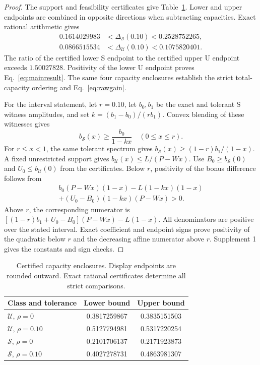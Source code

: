 \documentclass{optica-article}
\begin{document}
\begin{proof}
The support and feasibility certificates give Table~\ref{tab:capacity}. Lower and upper endpoints are combined in opposite directions when subtracting capacities. Exact rational arithmetic gives
\begin{align}
 0.1614029983&<\Delta_{\mathcal S}(0.10)<0.2528752265,\\
 0.0866515534&<\Delta_{\mathcal U}(0.10)<0.1075820401.
 \label{eq:bonusbounds}
\end{align}
The ratio of the certified lower S endpoint to the certified upper U endpoint exceeds $1.50027828$. Positivity of the lower U endpoint proves Eq.~\eqref{eq:mainresult}. The same four capacity enclosures establish the strict total-capacity ordering and Eq.~\eqref{eq:rawgain}.

For the interval statement, let $r=0.10$, let $b_0,b_1$ be the exact and tolerant S witness amplitudes, and set $k=(b_1-b_0)/(rb_1)$. Convex blending of these witnesses gives
\begin{equation}
 b_{\mathcal S}(x)\geq\frac{b_0}{1-kx}\quad(0\leq x\leq r).
 \label{eq:blend}
\end{equation}
For $r\leq x<1$, the same tolerant spectrum gives $b_{\mathcal S}(x)\geq(1-r)b_1/(1-x)$. A fixed unrestricted support gives $b_{\mathcal U}(x)\leq L/(P-Wx)$. Use $B_0\geq b_{\mathcal S}(0)$ and $U_0\leq b_{\mathcal U}(0)$ from the certificates. Below $r$, positivity of the bonus difference follows from
\begin{multline}
 b_0(P-Wx)(1-x)-L(1-kx)(1-x)\\
 +(U_0-B_0)(1-kx)(P-Wx)>0.
 \label{eq:intervalpolynomial}
\end{multline}
Above $r$, the corresponding numerator is $[(1-r)b_1+U_0-B_0](P-Wx)-L(1-x)$. All denominators are positive over the stated interval. Exact coefficient and endpoint signs prove positivity of the quadratic below $r$ and the decreasing affine numerator above $r$. Supplement 1 gives the constants and sign checks.
\end{proof}

\begin{table}[htbp]
\centering
\caption{Certified capacity enclosures. Display endpoints are rounded outward. Exact rational certificates determine all strict comparisons.}
\label{tab:capacity}
\begin{tabular}{lcc}
\toprule
Class and tolerance & Lower bound & Upper bound\\
\midrule
$\mathcal U$, $\rho=0$ & 0.3817259867 & 0.3835151503\\
$\mathcal U$, $\rho=0.10$ & 0.5127794981 & 0.5317220254\\
$\mathcal S$, $\rho=0$ & 0.2101706137 & 0.2171923873\\
$\mathcal S$, $\rho=0.10$ & 0.4027278731 & 0.4863981307\\
\bottomrule
\end{tabular}
\end{table}
\end{document}
